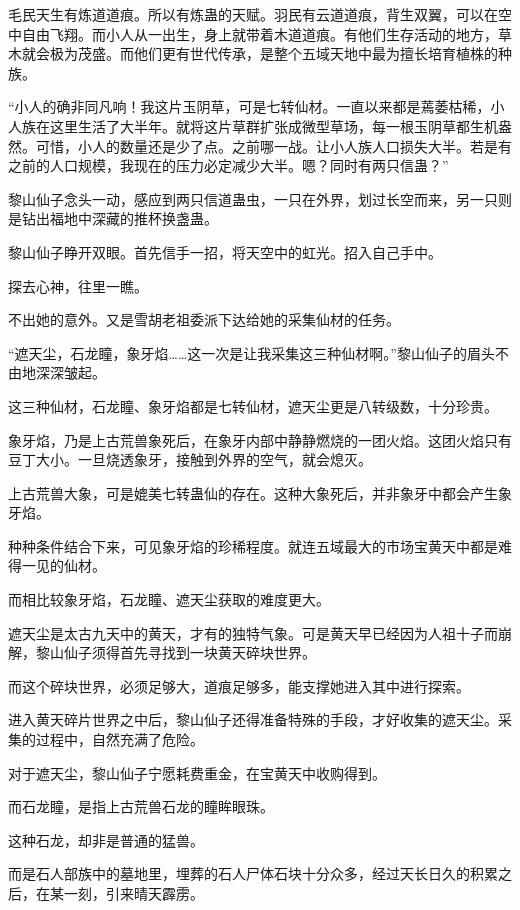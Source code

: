 \begin{this_body}
毛民天生有炼道道痕。所以有炼蛊的天赋。羽民有云道道痕，背生双翼，可以在空中自由飞翔。而小人从一出生，身上就带着木道道痕。有他们生存活动的地方，草木就会极为茂盛。而他们更有世代传承，是整个五域天地中最为擅长培育植株的种族。

“小人的确非同凡响！我这片玉阴草，可是七转仙材。一直以来都是蔫萎枯稀，小人族在这里生活了大半年。就将这片草群扩张成微型草场，每一根玉阴草都生机盎然。可惜，小人的数量还是少了点。之前哪一战。让小人族人口损失大半。若是有之前的人口规模，我现在的压力必定减少大半。嗯？同时有两只信蛊？”

黎山仙子念头一动，感应到两只信道蛊虫，一只在外界，划过长空而来，另一只则是钻出福地中深藏的推杯换盏蛊。

黎山仙子睁开双眼。首先信手一招，将天空中的虹光。招入自己手中。

探去心神，往里一瞧。

不出她的意外。又是雪胡老祖委派下达给她的采集仙材的任务。

“遮天尘，石龙瞳，象牙焰……这一次是让我采集这三种仙材啊。”黎山仙子的眉头不由地深深皱起。

这三种仙材，石龙瞳、象牙焰都是七转仙材，遮天尘更是八转级数，十分珍贵。

象牙焰，乃是上古荒兽象死后，在象牙内部中静静燃烧的一团火焰。这团火焰只有豆丁大小。一旦烧透象牙，接触到外界的空气，就会熄灭。

上古荒兽大象，可是媲美七转蛊仙的存在。这种大象死后，并非象牙中都会产生象牙焰。

种种条件结合下来，可见象牙焰的珍稀程度。就连五域最大的市场宝黄天中都是难得一见的仙材。

而相比较象牙焰，石龙瞳、遮天尘获取的难度更大。

遮天尘是太古九天中的黄天，才有的独特气象。可是黄天早已经因为人祖十子而崩解，黎山仙子须得首先寻找到一块黄天碎块世界。

而这个碎块世界，必须足够大，道痕足够多，能支撑她进入其中进行探索。

进入黄天碎片世界之中后，黎山仙子还得准备特殊的手段，才好收集的遮天尘。采集的过程中，自然充满了危险。

对于遮天尘，黎山仙子宁愿耗费重金，在宝黄天中收购得到。

而石龙瞳，是指上古荒兽石龙的瞳眸眼珠。

这种石龙，却非是普通的猛兽。

而是石人部族中的墓地里，埋葬的石人尸体石块十分众多，经过天长日久的积累之后，在某一刻，引来晴天霹雳。


\end{this_body}
